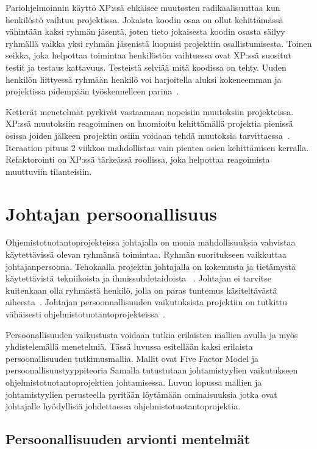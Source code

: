 \documentclass[finnish]{tktltiki2}
\theoremstyle{definition}
\theoremstyle{remark}
\begin{document}
Pariohjelmoinnin käyttö XP:ssä ehkäisee muutosten radikaalisuuttaa kun henkilöstö vaihtuu projektissa. Jokaista koodin osaa on ollut kehittämässä vähintään kaksi ryhmän jäsentä, joten tieto jokaisesta koodin osasta säilyy ryhmällä vaikka yksi ryhmän jäsenistä luopuisi projektiin osallistumisesta. Toinen seikka, joka helpottaa toimintaa henkilöstön vaihtuessa ovat XP:ssä suositut testit ja testaus kattavuus. Testeistä selviää mitä koodissa on tehty. Uuden henkilön liittyessä ryhmään henkilö voi harjoitella aluksi kokeneemman ja projektissa pidempään työskennelleen parina~\cite{796139}.

Ketterät menetelmät pyrkivät vastaamaan nopeisiin muutoksiin projekteissa. XP:ssä muutoksiin reagoiminen on huomioitu kehittämällä projektia pienissä osissa joiden jälkeen projektin osiiin voidaan tehdä muutoksia tarvittaessa~\cite{796139}. Iteraation pituus 2 viikkoa mahdollistaa vain pienten osien kehittämisen kerralla. Refaktorointi on XP:ssä tärkeässä roollissa, joka helpottaa reagoimista muuttuviin tilanteisiin. 


 

\section{Johtajan persoonallisuus}

Ohjemistotuotantoprojekteissa johtajalla on monia mahdollisuuksia vahvistaa käytettävissä olevan ryhmänsä toimintaa. Ryhmän suoritukseen vaikkuttaa johtajanpersoona. Tehokaalla projektin johtajalla on kokemusta ja tietämystä käytettävistä tekniikoista ja ihmissuhdetaidoista ~\cite{McLeod:2011:FAS:1978802.1978803}. Johtajan ei tarvitse kuitenkaan olla ryhmästä henkilö, jolla on paras tuntemus käsiteltävästä aiheesta~\cite{4017705}. Johtajan persoonnallisuuden vaikutuksista projektiin on tutkittu vähäisesti ohjelmistotuotantoprojekteissa~\cite{Wang:2009:PMP:1639950.1640049}. 

Persoonallisuuden vaikustusta voidaan tutkia erilaisten mallien avulla ja myös yhdistelemällä menetelmiä. Tässä luvussa esitellään kaksi erilaista persoonallisuuden tutkimusmallia. Mallit ovat Five Factor Model ja persoonallisuustyyppiteoria  Samalla tutustutaan johtamistyylien vaikutukseen ohjelmistotuotantoprojektien johtamisessa. Luvun lopussa mallien ja johtamistyylien perusteella pyritään löytämään ominaisuuksia jotka ovat johtajalle hyödyllisiä johdettaessa ohjelmistotuotantoprojektia.  


\subsection{Persoonallisuuden arvionti mentelmät}
\end{document}

